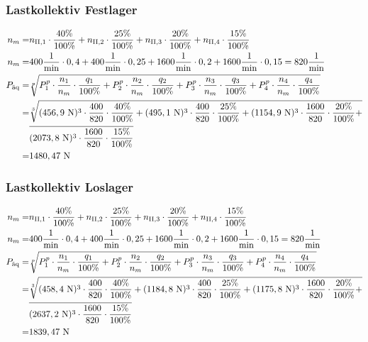 \subsubsection{Lastkollektiv Festlager}
\begin{align*}
	n_m =& n_{\mathord{\mathrm{II}},1} \cdot \frac{40 \%}{100 \%} + n_{\mathord{\mathrm{II}},2} \cdot \frac{25 \%}{100 \%} + n_{\mathord{\mathrm{II}},3} \cdot \frac{20 \%}{100 \%} + n_{\mathord{\mathrm{II}},4} \cdot \frac{15 \%}{100 \%} \\
	n_m =& 400 \frac{1}{\text{min}} \cdot 0,4 + 400 \frac{1}{\text{min}} \cdot 0,25 +1600 \frac{1}{\text{min}} \cdot 0,2 + 1600 \frac{1}{\text{min}} \cdot 0,15 = 820 \frac{1}{\text{min}} \\
	P_{\text{äq}} =& \sqrt[p]{P_1 ^{p} \cdot \frac{n_1}{n_m} \cdot \frac{q_1}{100\% } + P_2 ^{p} \cdot \frac{n_2}{n_m} \cdot \frac{q_2}{100 \%} + P_3 ^{p} \cdot \frac{n_3}{n_m} \cdot \frac{q_3}{100\% } + P_4 ^{p} \cdot \frac{n_4}{n_m} \cdot \frac{q_4}{100 \%}} \\
	=& \sqrt[3]{(456,9 \text{ N}) ^{3} \cdot \frac{400}{820} \cdot \frac{40 \%}{100 \%} +(495,1 \text{ N} )^{3} \cdot \frac{400}{820} \cdot \frac{25 \%}{100\% }+(1154,9 \text{ N} )^{3} \cdot \frac{1600}{820} \cdot \frac{20 \%}{100\% }+} \\ &\overline{(2073,8 \text{ N} )^{3} \cdot \frac{1600}{820} \cdot \frac{15 \%}{100\% }} \\
	=& 1480,47 \text{ N}
\end{align*}
\subsubsection{Lastkollektiv Loslager}
\begin{align*}
	n_m =& n_{\mathord{\mathrm{II}},1} \cdot \frac{40 \%}{100 \%} + n_{\mathord{\mathrm{II}},2} \cdot \frac{25 \%}{100 \%} + n_{\mathord{\mathrm{II}},3} \cdot \frac{20 \%}{100 \%} + n_{\mathord{\mathrm{II}},4} \cdot \frac{15 \%}{100 \%} \\
	n_m =& 400 \frac{1}{\text{min}} \cdot 0,4 + 400 \frac{1}{\text{min}} \cdot 0,25 + 1600 \frac{1}{\text{min}} \cdot 0,2 + 1600 \frac{1}{\text{min}} \cdot 0,15 = 820 \frac{1}{\text{min}} \\
	P_{\text{äq}} =& \sqrt[p]{P_1 ^{p} \cdot \frac{n_1}{n_m} \cdot \frac{q_1}{100\% } + P_2 ^{p} \cdot \frac{n_2}{n_m} \cdot \frac{q_2}{100 \%} +P_3 ^{p} \cdot \frac{n_3}{n_m} \cdot \frac{q_3}{100\% } + P_4 ^{p} \cdot \frac{n_4}{n_m} \cdot \frac{q_4}{100 \%}} \\
	=& \sqrt[3]{(458,4 \text{ N}) ^{3} \cdot \frac{400}{820} \cdot \frac{40 \%}{100 \%} +(1184,8 \text{ N} )^{3} \cdot \frac{400}{820} \cdot \frac{25 \%}{100\% }+(1175,8 \text{ N} )^{3} \cdot \frac{1600}{820} \cdot \frac{20 \%}{100\% } +}\\
	&\overline{(2637,2 \text{ N} )^{3} \cdot \frac{1600}{820} \cdot\frac{15 \%}{100\% }} \\
	=& 1839,47 \text{ N}
\end{align*}
\newpage
